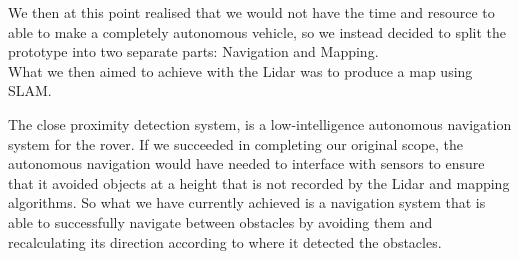 We then at this point realised that we would not have the time and resource to able to make a completely autonomous vehicle, so we instead decided to split the prototype into two separate parts: Navigation and Mapping.\\
What we then aimed to achieve with the Lidar was to produce a map using SLAM. %

The close proximity detection system, is a low-intelligence autonomous navigation system for the rover. If we succeeded in completing our original scope, the autonomous navigation would have needed to interface with sensors to ensure that it avoided objects at a height that is not recorded by the Lidar and mapping algorithms. So what we have currently achieved is a navigation system that is able to successfully navigate between obstacles by avoiding them and recalculating its direction according to where it detected the obstacles.\\

